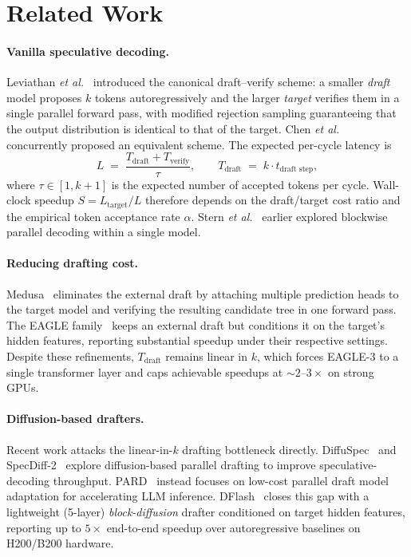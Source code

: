 \section{Related Work}
\label{sec:related}

\paragraph{Vanilla speculative decoding.}
Leviathan \emph{et al.}~\cite{Leviathan2023} introduced the canonical
draft--verify scheme: a smaller \emph{draft} model proposes $k$ tokens
autoregressively and the larger \emph{target} verifies them in a single
parallel forward pass, with modified rejection sampling guaranteeing that the
output distribution is identical to that of the target. Chen
\emph{et al.}~\cite{Chen2023specsampling} concurrently proposed an equivalent
scheme. The expected per-cycle latency is
\begin{equation}
  L \;=\; \frac{T_{\text{draft}} + T_{\text{verify}}}{\tau},
  \qquad
  T_{\text{draft}} \;=\; k \cdot t_{\text{draft step}},
  \label{eq:specdec-latency}
\end{equation}
where $\tau \in [1, k{+}1]$ is the expected number of accepted tokens per
cycle. Wall-clock speedup $S = L_{\text{target}}/L$ therefore depends on the
draft/target cost ratio and the empirical token acceptance rate $\alpha$.
Stern \emph{et al.}~\cite{Stern2018blockwise} earlier explored blockwise
parallel decoding within a single model.

\paragraph{Reducing drafting cost.}
Medusa~\cite{Cai2024Medusa} eliminates the external draft by attaching
multiple prediction heads to the target model and verifying the resulting
candidate tree in one forward pass. The EAGLE
family~\cite{Li2024Eagle,Li2024Eagle2,Li2025Eagle3} keeps an external draft
but conditions it on the target's hidden features, reporting substantial
speedup under their respective settings. Despite these refinements, $T_{\text{draft}}$
remains linear in $k$, which forces EAGLE-3 to a single transformer layer
and caps achievable speedups at $\sim$$2$--$3\times$ on strong GPUs.

\paragraph{Diffusion-based drafters.}
Recent work attacks the linear-in-$k$ drafting bottleneck directly.
DiffuSpec~\cite{Li2025DiffuSpec} and SpecDiff-2~\cite{Sandler2025SpecDiff2}
explore diffusion-based parallel drafting to improve speculative-decoding
throughput. PARD~\cite{An2025PARD} instead focuses on low-cost parallel draft
model adaptation for accelerating LLM inference. DFlash~\cite{Chen2026dflash} closes this gap with a
lightweight (5-layer) \emph{block-diffusion} drafter conditioned on target
hidden features, reporting up to $5\times$ end-to-end speedup over
autoregressive baselines on H200/B200 hardware.

